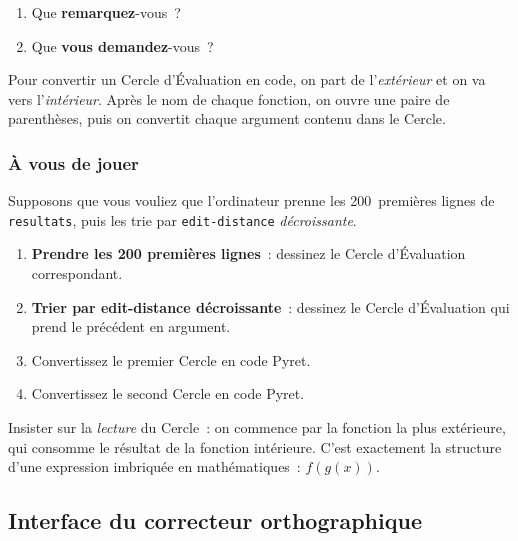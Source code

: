 \documentclass[12pt,a4paper]{article}
\begin{document}
\begin{activitybox}
  \begin{enumerate}[leftmargin=*]
    \item Que \textbf{remarquez}-vous~?
    \item Que \textbf{vous demandez}-vous~?
  \end{enumerate}
\end{activitybox}

Pour convertir un Cercle d'Évaluation en code, on part de l'\emph{extérieur} et on va vers l'\emph{intérieur}. Après le nom de chaque fonction, on ouvre une paire de parenthèses, puis on convertit chaque argument contenu dans le Cercle.

\subsubsection{À vous de jouer}

Supposons que vous vouliez que l'ordinateur prenne les 200~premières lignes de \texttt{resultats}, puis les trie par \texttt{edit-distance} \emph{décroissante}.

\begin{activitybox}
  \begin{enumerate}[leftmargin=*]
    \item \textbf{Prendre les 200 premières lignes}~: dessinez le Cercle d'Évaluation correspondant.
    \item \textbf{Trier par edit-distance décroissante}~: dessinez le Cercle d'Évaluation qui prend le précédent en argument.
    \item Convertissez le premier Cercle en code Pyret.
    \item Convertissez le second Cercle en code Pyret.
  \end{enumerate}
\end{activitybox}

\begin{instructornotes}
  Insister sur la \emph{lecture} du Cercle~: on commence par la fonction la plus extérieure, qui consomme le résultat de la fonction intérieure. C'est exactement la structure d'une expression imbriquée en mathématiques~: $f(g(x))$.
\end{instructornotes}

\subsection{Interface du correcteur orthographique}
\end{document}
